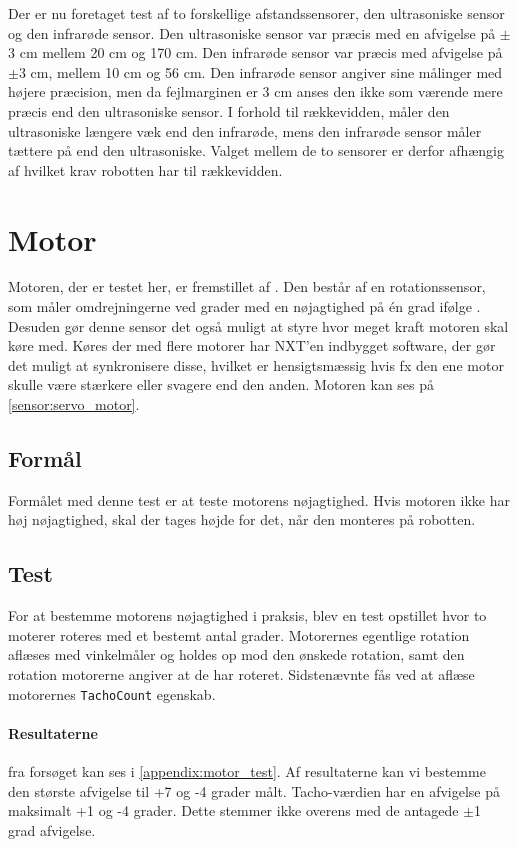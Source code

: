 Der er nu foretaget test af to forskellige afstandssensorer, den ultrasoniske sensor og den infrarøde sensor. 
Den ultrasoniske sensor var præcis med en afvigelse på $\pm$3 cm mellem 20 cm og 170 cm.
Den infrarøde sensor var præcis med afvigelse på $\pm$3 cm, mellem 10 cm og 56 cm.
Den infrarøde sensor angiver sine målinger med højere præcision, men da fejlmarginen er 3 cm anses den ikke som værende mere præcis end den ultrasoniske sensor.
I forhold til rækkevidden, måler den ultrasoniske længere væk end den infrarøde, mens den infrarøde sensor måler tættere på end den ultrasoniske.
Valget mellem de to sensorer er derfor afhængig af hvilket krav robotten har til rækkevidden.

\section{Motor}\label{sensorer:motorer}
Motoren, der er testet her, er fremstillet af \lego.
Den består af en rotationssensor, som måler omdrejningerne ved grader med en nøjagtighed på \'en grad ifølge \lego. 
Desuden gør denne sensor det også muligt at styre hvor meget kraft motoren skal køre med.
Køres der med flere motorer har NXT'en indbygget software, der gør det muligt at synkronisere disse, hvilket er hensigtsmæssig hvis fx den ene motor skulle være stærkere eller svagere end den anden.\cite{tikNXT}
Motoren kan ses på \cref{sensor:servo_motor}.

\subsection{Formål}
Formålet med denne test er at teste motorens nøjagtighed.
Hvis motoren ikke har høj nøjagtighed, skal der tages højde for det, når den monteres på robotten.

\subsection{Test}
For at bestemme motorens nøjagtighed i praksis, blev en test opstillet hvor to moterer roteres med et bestemt antal grader.
Motorernes egentlige rotation aflæses med vinkelmåler og holdes op mod den ønskede rotation, samt den rotation motorerne angiver at de har roteret.
Sidstenævnte fås ved at aflæse motorernes \lstinline[style=csharp]!TachoCount! egenskab.

\paragraph{Resultaterne} fra forsøget kan ses i \cref{appendix:motor_test}. 
Af resultaterne kan vi bestemme den største afvigelse til +7 og -4 grader målt.
Tacho-værdien har en afvigelse på maksimalt +1 og -4 grader.
Dette stemmer ikke overens med de antagede $\pm$1 grad afvigelse.

